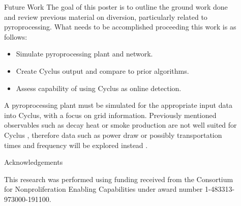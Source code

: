 \documentclass[final]{beamer}
\newlength{\sepwid}
\newlength{\onecolwid}
\newlength{\threecolwid}
\begin{document}
\begin{frame}[t]
\begin{columns}[t,totalwidth=\threecolwid]
\begin{column}{\onecolwid}

\end{column} %

\begin{column}{\sepwid}\end{column} %

\begin{column}{\onecolwid} %
	

\begin{block}{Future Work}
	The goal of this poster is to outline the ground work done and review previous material on diversion, particularly related
	to pyroprocessing. What needs to be accomplished proceeding this work is as follows:
	\begin{itemize}
		\item Simulate pyroprocessing plant and network.
		\item Create Cyclus output and compare to prior algorithms.
		\item Assess capability of using Cyclus as online detection.
	\end{itemize} 
	\vspace{10mm}
	A pyroprocessing plant must be simulated for the appropriate input data into Cyclus, with a focus on grid
	information. Previously mentioned observables such as decay heat or smoke production are not well suited for
	Cyclus \cite{Huff_2016}, therefore data such as power draw or possibly transportation times and frequency will be explored 
	instead \cite{Hou_2016}.
\end{block}



\begin{block}{Acknowledgements}
	
	This research was performed using funding received
	from the Consortium for Nonproliferation Enabling
	Capabilities under award number 1-483313-973000-191100.
	

\end{block}
\end{column}
\end{columns}
\end{frame}
\end{document}
